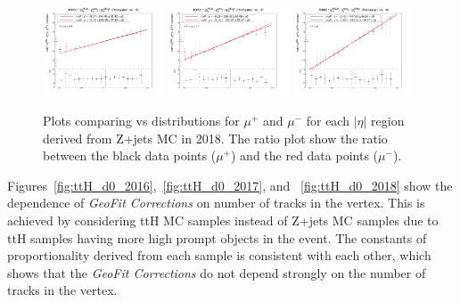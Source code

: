 \begin{figure}[h!]
    \centering
    \includegraphics[width=0.32\textwidth]{images_geofit/muCharge_eta_0_0p9_2018.png}
    \includegraphics[width=0.32\textwidth]{images_geofit/muCharge_eta_0p9_1p7_2018.png}
    \includegraphics[width=0.32\textwidth]{images_geofit/muCharge_eta_1p7_inf_2018.png}
    \caption{Plots comparing \dptoverptsquare vs \dzeroBS distributions for $\mu^+$ and $\mu^-$ for each $|\eta|$ region derived from Z+jets MC in 2018. The ratio plot show the ratio between the black data points ($\mu^+$) and the red data points ($\mu^-$).}
    \label{fig:muCharge_d0_2018}
\end{figure}

Figures~\ref{fig:ttH_d0_2016},~\ref{fig:ttH_d0_2017}, and ~\ref{fig:ttH_d0_2018} show the dependence of \textit{GeoFit Corrections} on number of tracks in the vertex. This is achieved by considering ttH MC samples instead of Z+jets MC samples due to ttH samples having more high \pt prompt objects in the event. The constants of proportionality derived from each sample is consistent with each other, which shows that the \textit{GeoFit Corrections} do not depend strongly on the number of tracks in the vertex.

